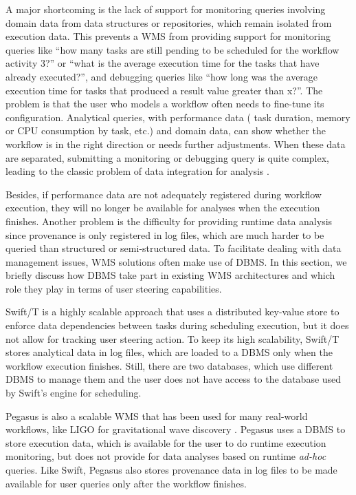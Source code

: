 A major shortcoming is the lack of support for monitoring queries
involving domain data from data structures or repositories, which remain
isolated from execution data. This prevents a WMS from providing
support for monitoring queries like ``how many tasks are still pending to
be scheduled for the workflow activity 3?'' or ``what is the average
execution time for the tasks that have already executed?'', and debugging
queries like ``how long was the average execution time for tasks that
produced a result value greater than x?''. The problem is that the user
who models a workflow often needs to fine-tune its configuration.
Analytical queries, with performance data (\eg{} task duration,
memory or CPU consumption by task, etc.) and domain data, can show
whether the workflow is in the right direction or needs further
adjustments. When these data are separated, submitting a monitoring or
debugging query is quite complex, leading to the classic problem of data
integration for analysis \cite{Jagadish2014Big}.

Besides, if performance data are not adequately registered during
workflow execution, they will no longer be available for analyses when
the execution finishes. Another problem is the difficulty for providing
runtime data analysis since provenance is only registered in log files,
which are much harder to be queried than structured or semi-structured
data. To facilitate dealing with data management issues, WMS solutions often
make use of DBMS. In this section, we briefly discuss how DBMS take part
in existing WMS architectures and which role they play in terms of user steering capabilities.

Swift/T \cite{Wozniak2013Swift/T:,Duro2016Flexible}
is a highly scalable approach that uses a distributed key-value store to
enforce data dependencies between tasks during scheduling execution, but
it does not allow for tracking user steering action.
To keep its high scalability,
Swift/T stores analytical data in log files, which are loaded to a DBMS
only when the workflow execution finishes. Still, there are two
databases, which use different DBMS to manage them and the user does not
have access to the database used by Swift's engine for scheduling.

Pegasus \cite{Deelman2015Pegasus}
is also a scalable WMS that has been used for many real-world workflows, like LIGO for gravitational wave
discovery \cite{PhysRevLett.118.221101}.
Pegasus uses a DBMS to store execution data, which is available for the
user to do runtime execution monitoring, but does not provide for data
analyses based on runtime \emph{ad-hoc} queries. Like Swift, Pegasus
also stores provenance data in log files to be made available for
user queries only after the workflow finishes.

